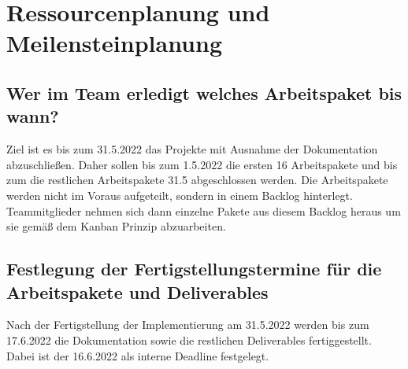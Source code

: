 \section{Ressourcenplanung und Meilensteinplanung}

\subsection{Wer im Team erledigt welches Arbeitspaket bis wann?}

Ziel ist es bis zum 31.5.2022 das Projekte mit Ausnahme der Dokumentation abzuschließen.
Daher sollen bis zum 1.5.2022 die ersten 16 Arbeitspakete und bis zum die restlichen Arbeitspakete 31.5 abgeschlossen werden.
Die Arbeitspakete werden nicht im Voraus aufgeteilt, sondern in einem Backlog hinterlegt. 
Teammitglieder nehmen sich dann einzelne Pakete aus diesem Backlog heraus um sie gemäß dem Kanban Prinzip abzuarbeiten.


\subsection{Festlegung der Fertigstellungstermine für die Arbeitspakete und Deliverables}

Nach der Fertigstellung der Implementierung am 31.5.2022 werden bis zum 17.6.2022 die Dokumentation sowie die restlichen Deliverables fertiggestellt.
Dabei ist der 16.6.2022 als interne Deadline festgelegt.
